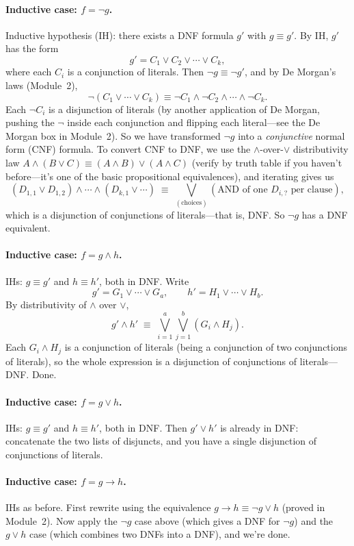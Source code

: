 \documentclass[11pt]{article}
\begin{document}
\paragraph{Inductive case: $f = \lnot g$.} Inductive hypothesis (IH): there exists a DNF formula $g'$ with $g \equiv g'$. By IH, $g'$ has the form
\[
  g' = C_1 \vee C_2 \vee \cdots \vee C_k,
\]
where each $C_i$ is a conjunction of literals. Then $\lnot g \equiv \lnot g'$, and by De Morgan's laws (Module~2),
\[
  \lnot (C_1 \vee \cdots \vee C_k) \equiv \lnot C_1 \wedge \lnot C_2 \wedge \cdots \wedge \lnot C_k.
\]
Each $\lnot C_i$ is a disjunction of literals (by another application of De Morgan, pushing the $\lnot$ inside each conjunction and flipping each literal---see the De Morgan box in Module~2). So we have transformed $\lnot g$ into a \emph{conjunctive} normal form (CNF) formula. To convert CNF to DNF, we use the $\wedge$-over-$\vee$ distributivity law $A \wedge (B \vee C) \equiv (A \wedge B) \vee (A \wedge C)$ (verify by truth table if you haven't before---it's one of the basic propositional equivalences), and iterating gives us
\[
  (D_{1,1} \vee D_{1,2}) \wedge \cdots \wedge (D_{k,1} \vee \cdots) \;\equiv\; \bigvee_{(\text{choices})} (\text{AND of one } D_{i,?} \text{ per clause}),
\]
which is a disjunction of conjunctions of literals---that is, DNF. So $\lnot g$ has a DNF equivalent.

\paragraph{Inductive case: $f = g \wedge h$.} IHs: $g \equiv g'$ and $h \equiv h'$, both in DNF. Write
\[
  g' = G_1 \vee \cdots \vee G_a, \qquad h' = H_1 \vee \cdots \vee H_b.
\]
By distributivity of $\wedge$ over $\vee$,
\[
  g' \wedge h' \;\equiv\; \bigvee_{i=1}^{a} \bigvee_{j=1}^{b} (G_i \wedge H_j).
\]
Each $G_i \wedge H_j$ is a conjunction of literals (being a conjunction of two conjunctions of literals), so the whole expression is a disjunction of conjunctions of literals---DNF. Done.

\paragraph{Inductive case: $f = g \vee h$.} IHs: $g \equiv g'$ and $h \equiv h'$, both in DNF. Then $g' \vee h'$ is already in DNF: concatenate the two lists of disjuncts, and you have a single disjunction of conjunctions of literals.

\paragraph{Inductive case: $f = g \to h$.} IHs as before. First rewrite using the equivalence $g \to h \equiv \lnot g \vee h$ (proved in Module~2). Now apply the $\lnot g$ case above (which gives a DNF for $\lnot g$) and the $g \vee h$ case (which combines two DNFs into a DNF), and we're done.
\end{document}
